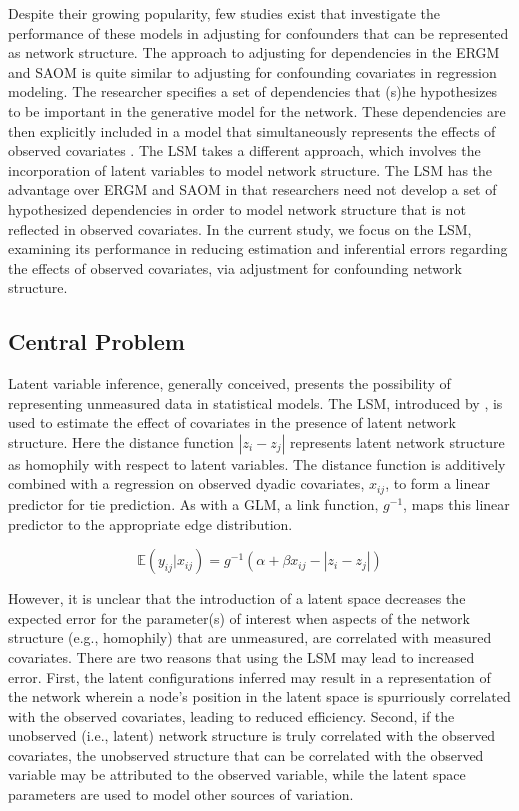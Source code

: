 \documentclass[11pt]{article}
\begin{document}
Despite their growing popularity, few studies exist that investigate the performance of these models in adjusting for confounders that can be represented as network structure.  The approach to adjusting for dependencies in the ERGM and SAOM is quite similar to adjusting for confounding covariates in regression modeling. The researcher specifies a set of dependencies that (s)he hypothesizes to be important in the generative model for the network. These dependencies are then explicitly included in a model that simultaneously represents the effects of observed covariates \citep{cranmer2011pa}. The LSM takes a different approach, which involves the incorporation of latent variables to model network structure. The LSM has the advantage over ERGM and SAOM in that researchers need not develop a set of hypothesized dependencies in order to model network structure that is not reflected in observed covariates. In the current study, we focus on the LSM, examining its performance in reducing estimation and inferential errors regarding the effects of observed covariates, via adjustment for confounding network structure.

\subsection{Central Problem}

Latent variable inference, generally conceived, presents the possibility of representing unmeasured data in statistical models. The LSM, introduced by \citet{hoff2002latent}, is used to estimate the effect of covariates in the presence of latent network structure. Here the distance function $|z_i - z_j|$ represents latent network structure as homophily with respect to latent variables.  The distance function is additively combined with a regression on observed dyadic covariates, $x_{ij}$, to form a linear predictor for tie prediction.  As with a GLM, a link function, $g^{-1}$, maps this linear predictor to the appropriate edge distribution.

$$\mathbb{E}(y_{ij} | x_{ij}) = g^{-1}(\alpha + \beta x_{ij} - |z_i - z_j|)$$

However, it is unclear that the introduction of a latent space decreases the expected error for the parameter(s) of interest when aspects of the network structure (e.g., homophily) that are unmeasured, are correlated with measured covariates. There are two reasons that using the LSM may lead to increased error. First, the latent configurations inferred may result in a representation of the network wherein a node's position in the latent space is spurriously correlated with the observed covariates, leading to reduced efficiency. Second, if the unobserved (i.e., latent) network structure is truly correlated with the observed covariates, the unobserved structure that can be correlated with the observed variable may be attributed to the observed variable, while the latent space parameters are used to model other sources of variation. 
\end{document}
